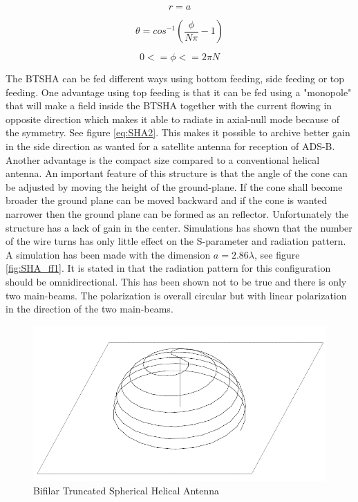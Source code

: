 \begin{equation}\label{eq:SHA1}
r = a
\end{equation}

\begin{equation}\label{eq:SHA2}
\theta = cos^{-1}(\frac{\phi}{N\pi}-1)
\end{equation}

\begin{equation}\label{eq:SHA3}
0<=\phi<=2\pi N
\end{equation}

The BTSHA can be fed different ways using bottom feeding, side feeding or top feeding. One advantage using top feeding is that it can be fed using a "monopole" that will make a field inside the BTSHA together with the current flowing in opposite direction which makes it able to radiate in axial-null mode because of the symmetry. See figure \ref{eq:SHA2}. This makes it possible to archive better gain in the side direction as wanted for a satellite antenna for reception of ADS-B. Another advantage is the compact size compared to a conventional helical antenna. An important feature of this structure is that the angle of the cone can be adjusted by moving the height of the ground-plane. If the cone shall become broader the ground plane can be moved backward and if the cone is wanted narrower then the ground plane can be formed as an reflector. Unfortunately the structure has a lack of gain in the center. Simulations has shown that the number of the wire turns has only little effect on the S-parameter and radiation pattern. A simulation has been made with the dimension $a=2.86\lambda$, see figure \ref{fig:SHA_ff1}. It is stated in \citep{Clark2003} that the radiation pattern for this configuration should be omnidirectional. This has been shown not to be true and there is only two main-beams. The polarization is overall circular but with linear polarization in the direction of the two main-beams.    

\begin{figure}[H]
\centering 
\includegraphics[scale = 0.5]{figures/antennas/hemispherical/hemispherical1}
\caption{Bifilar Truncated Spherical Helical Antenna \citep{Clark2003}}
\label{fig:SHA1}
\end{figure} 

